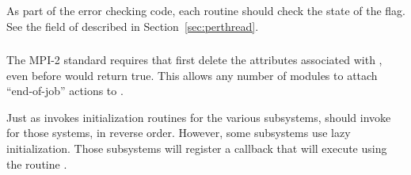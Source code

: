 \documentclass{article}
\begin{document}
\subsubsection{}
As part of the error checking code, each routine should check the
state of the  flag.  
See the  field of 
described in Section~\ref{sec:perthread}. 

\subsubsection{}
\label{sec:finalize}
The MPI-2 standard requires that  first delete the
attributes associated with , even before
 would return true.  This allows any number of
modules to attach ``end-of-job'' actions to .

Just as  invokes initialization routines for
the various subsystems,  should invoke
 for those systems, in reverse order.
However, some subsystems use lazy initialization.  Those subsystems will
register a callback that  will execute using the routine
.  



\end{document}
